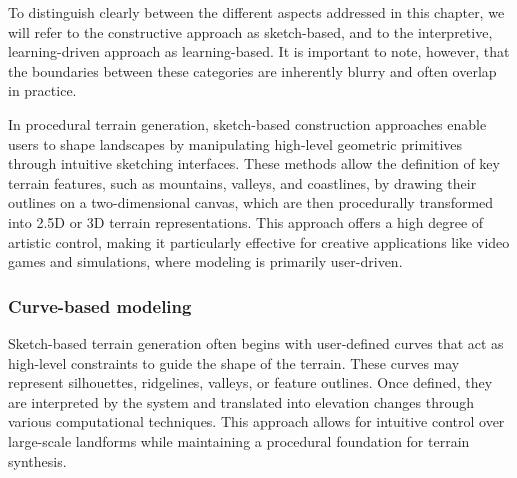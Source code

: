 To distinguish clearly between the different aspects addressed in this chapter, we will refer to the constructive approach as sketch-based, and to the interpretive, learning-driven approach as learning-based. It is important to note, however, that the boundaries between these categories are inherently blurry and often overlap in practice.

In procedural terrain generation, sketch-based construction approaches enable users to shape landscapes by manipulating high-level geometric primitives through intuitive sketching interfaces. These methods allow the definition of key terrain features, such as mountains, valleys, and coastlines, by drawing their outlines on a two-dimensional canvas, which are then procedurally transformed into 2.5D or 3D terrain representations. This approach offers a high degree of artistic control, making it particularly effective for creative applications like video games and simulations, where modeling is primarily user-driven.

\subsubsection{Curve-based modeling}

Sketch-based terrain generation often begins with user-defined curves that act as high-level constraints to guide the shape of the terrain. These curves may represent silhouettes, ridgelines, valleys, or feature outlines. Once defined, they are interpreted by the system and translated into elevation changes through various computational techniques. This approach allows for intuitive control over large-scale landforms while maintaining a procedural foundation for terrain synthesis.


